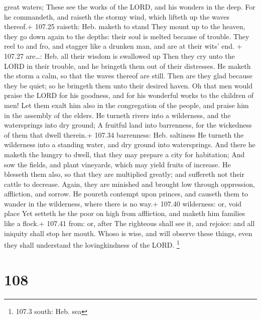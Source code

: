 great waters;  These see the works of the LORD, and his
wonders in the deep.  For he commandeth, and raiseth the
stormy wind, which lifteth up the waves thereof.+ 107.25 raiseth: Heb.
maketh to stand  They mount up to the heaven, they go down
again to the depths: their soul is melted because of trouble.
 They reel to and fro, and stagger like a drunken man, and
are at their wits' end. + 107.27 are\ldots: Heb. all their wisdom is
swallowed up  Then they cry unto the LORD in their trouble,
and he bringeth them out of their distresses.  He maketh
the storm a calm, so that the waves thereof are still. 
Then are they glad because they be quiet; so he bringeth them unto their
desired haven.  Oh that men would praise the LORD for his
goodness, and for his wonderful works to the children of men!
 Let them exalt him also in the congregation of the people,
and praise him in the assembly of the elders.  He turneth
rivers into a wilderness, and the watersprings into dry ground;
 A fruitful land into barrenness, for the wickedness of
them that dwell therein.+ 107.34 barrenness: Heb. saltiness
 He turneth the wilderness into a standing water, and dry
ground into watersprings.  And there he maketh the hungry
to dwell, that they may prepare a city for habitation;  And
sow the fields, and plant vineyards, which may yield fruits of increase.
 He blesseth them also, so that they are multiplied
greatly; and suffereth not their cattle to decrease. 
Again, they are minished and brought low through oppression, affliction,
and sorrow.  He poureth contempt upon princes, and causeth
them to wander in the wilderness, where there is no way.+ 107.40
wilderness: or, void place  Yet setteth he the poor on high
from affliction, and maketh him families like a flock.+ 107.41 from: or,
after  The righteous shall see it, and rejoice: and all
iniquity shall stop her mouth.  Whoso is wise, and will
observe these things, even they shall understand the lovingkindness of
the LORD. \footnote{107.3 south: Heb. sea}

\hypertarget{section-107}{%
\section{108}\label{section-107}}

